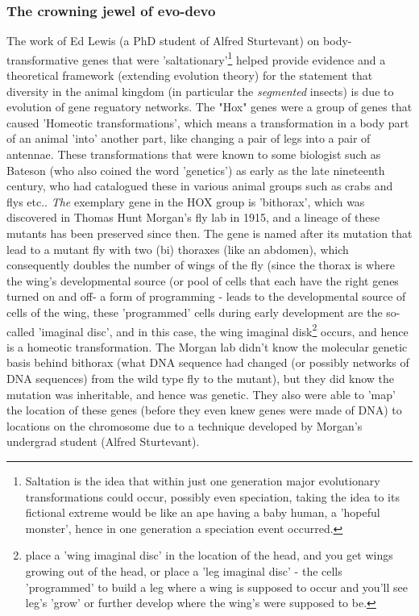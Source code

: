 \subsubsection{The crowning jewel of evo-devo}
The work of Ed Lewis (a PhD student of Alfred Sturtevant) on body-transformative genes that were 'saltationary'\footnote{Saltation is the idea that within just one generation major evolutionary transformations could occur, possibly even speciation, taking the idea to its fictional extreme would be like an ape having a baby human, a 'hopeful monster', hence in one generation a speciation event occurred.} helped provide evidence and a theoretical framework (extending evolution theory) for the statement that diversity in the animal kingdom (in particular the \textit{segmented} insects) is due to evolution of gene reguatory networks.  The "Hox" genes were a group of genes that caused 'Homeotic transformations', which means a transformation in a body part of an animal 'into' another part, like changing a pair of legs into a pair of antennae.  These transformations that were known to some biologist such as Bateson (who also coined the word 'genetics') as early as the late nineteenth century, who had catalogued these in various animal groups such as crabs and flys etc..  \textit{The} exemplary gene in the HOX group is 'bithorax', which was discovered in Thomas Hunt Morgan's fly lab in 1915, and a lineage of these mutants has been preserved since then. The gene is named after its mutation that lead to a mutant fly with two (bi) thoraxes (like an abdomen), which consequently doubles the number of wings of the fly (since the thorax is where the wing's developmental source (or pool of cells that each have the right genes turned on and off- a form of programming - leads to the developmental source of cells of the wing, these 'programmed' cells during early development are the so-called 'imaginal disc', and in this case, the wing imaginal disk\footnote{place a 'wing imaginal disc' in the location of the head, and you get wings growing out of the head, or place a 'leg imaginal disc' - the cells 'programmed' to build a leg where a wing is supposed to occur and you'll see leg's 'grow' or further develop where the wing's were supposed to be.} occurs, and hence is a homeotic transformation.  The Morgan lab didn't know the molecular genetic basis behind bithorax (what DNA sequence had changed (or possibly networks of DNA sequences) from the wild type fly to the mutant), but they did know the mutation was inheritable, and hence was genetic.  They also were able to 'map' the location of these genes (before they even knew genes were made of DNA) to locations on the chromosome due to a technique developed by Morgan's undergrad student (Alfred Sturtevant).  

